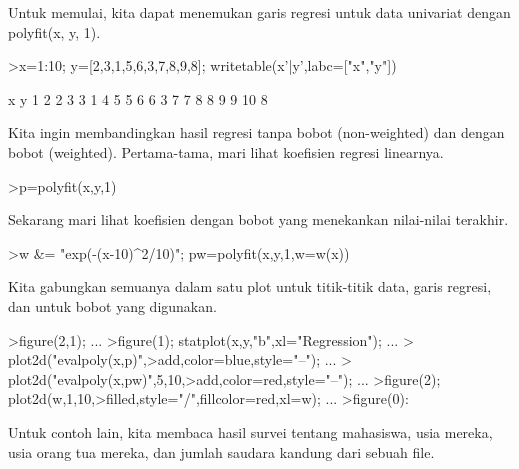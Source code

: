 \documentclass[a4paper,10pt]{article}
\begin{document}
\begin{eulernotebook}
\begin{eulercomment}
Untuk memulai, kita dapat menemukan garis regresi untuk data univariat
dengan polyfit(x, y, 1).
\end{eulercomment}
\begin{eulerprompt}
>x=1:10; y=[2,3,1,5,6,3,7,8,9,8]; writetable(x'|y',labc=["x","y"])
\end{eulerprompt}
\begin{euleroutput}
           x         y
           1         2
           2         3
           3         1
           4         5
           5         6
           6         3
           7         7
           8         8
           9         9
          10         8
\end{euleroutput}
\begin{eulercomment}
Kita ingin membandingkan hasil regresi tanpa bobot (non-weighted) dan
dengan bobot (weighted). Pertama-tama, mari lihat koefisien regresi
linearnya.
\end{eulercomment}
\begin{eulerprompt}
>p=polyfit(x,y,1)
\end{eulerprompt}
\begin{euleroutput}
  [0.733333,  0.812121]
\end{euleroutput}
\begin{eulercomment}
Sekarang mari lihat koefisien dengan bobot yang menekankan nilai-nilai
terakhir.
\end{eulercomment}
\begin{eulerprompt}
>w &= "exp(-(x-10)^2/10)"; pw=polyfit(x,y,1,w=w(x))
\end{eulerprompt}
\begin{euleroutput}
  [4.71566,  0.38319]
\end{euleroutput}
\begin{eulercomment}
Kita gabungkan semuanya dalam satu plot untuk titik-titik data, garis
regresi, dan untuk bobot yang digunakan.
\end{eulercomment}
\begin{eulerprompt}
>figure(2,1);  ...
>figure(1); statplot(x,y,"b",xl="Regression"); ...
>  plot2d("evalpoly(x,p)",>add,color=blue,style="--"); ...
>  plot2d("evalpoly(x,pw)",5,10,>add,color=red,style="--"); ...
>figure(2); plot2d(w,1,10,>filled,style="/",fillcolor=red,xl=w); ...
>figure(0):
\end{eulerprompt}
\begin{eulercomment}
Untuk contoh lain, kita membaca hasil survei tentang mahasiswa, usia
mereka, usia orang tua mereka, dan jumlah saudara kandung dari sebuah
file.


\end{eulercomment}
\end{eulernotebook}
\end{document}
